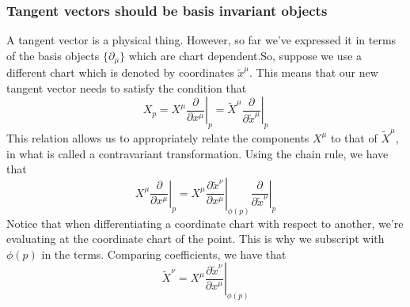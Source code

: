 \subsubsection*{Tangent vectors should be basis invariant objects} 
A tangent vector is a physical thing. However, so far we've expressed it in terms of the basis objects $ \{ \partial_\mu \} $ which are chart dependent.So, suppose we use a different chart which is denoted by coordinates $ \tilde{x}^\mu$. This means that our new tangent vector needs to satisfy the condition that 
\[ 
X_p = X^\mu \left.  \frac{ \partial}{ \partial x^\mu } \right\vert_{ p}   = \tilde{X}^\mu \left. \frac{ \partial }{ \partial \tilde{x}^\mu} \right\vert_p
\] 
This relation allows us to appropriately relate the components $X^\mu$ to that of $\tilde{X}^\mu$, in what is called a contravariant transformation. Using the chain rule, we have that 
\[ 
X^\mu \left. \frac{\partial}{ \partial x^\mu} \right\vert_p  = X^\mu \left. \frac{ \partial \tilde{ x}^\nu}{ \partial x^\mu} \right\vert_{ \phi(p )} \left. \frac{ \partial}{ \partial \tilde{x}^\nu } \right\vert_p 
\] Notice that when differentiating a coordinate chart with respect to another, we're evaluating at the coordinate chart of the point. This is why we subscript with $\phi( p)$ in the terms. Comparing coefficients, we have that 
\[ \tilde{X}^\nu = X^\mu \left. \frac{ \partial \tilde{x}^\nu }{ \partial x^\mu } \right\vert_{ \phi(p) } \] 


